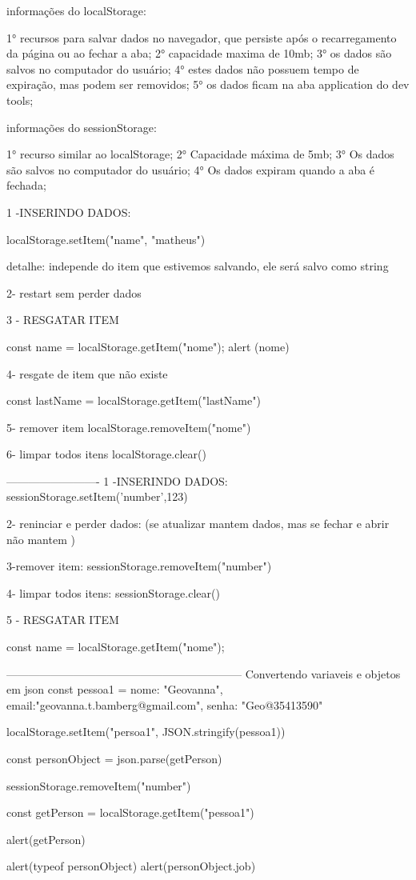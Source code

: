 informações do localStorage:

1° recursos para salvar dados no navegador, que persiste após o recarregamento da página ou ao fechar a aba;
2° capacidade maxima de 10mb;
3° os dados são salvos no computador do usuário;
4° estes dados não possuem tempo de expiração, mas podem ser removidos;
5° os dados ficam na aba application do dev tools;

informações do sessionStorage:

1° recurso similar ao localStorage;
2° Capacidade máxima de 5mb;
3° Os dados são salvos no computador do usuário;
4° Os dados expiram quando a aba é fechada;


1 -INSERINDO DADOS:

localStorage.setItem("name", "matheus")

detalhe: independe do item que estivemos salvando, ele será salvo como string

2- restart sem perder dados

3 - RESGATAR ITEM 

const name = localStorage.getItem("nome");
alert (nome)

4- resgate de item que não existe

const lastName = localStorage.getItem("lastName")

5- remover item
localStorage.removeItem("nome")

6- limpar todos itens
localStorage.clear()

-------------------------
1 -INSERINDO DADOS:
sessionStorage.setItem('number',123)

2- reninciar e perder dados: 
(se atualizar mantem dados, mas se fechar e abrir não mantem )


3-remover item:
sessionStorage.removeItem("number")

4- limpar todos itens: 
sessionStorage.clear()

5 - RESGATAR ITEM 

const name = localStorage.getItem("nome");

---------------------------------------------------------------
Convertendo variaveis e objetos em json
const pessoa1 = {
    nome: "Geovanna",
    email:"geovanna.t.bamberg@gmail.com",
    senha: "Geo@35413590"
}

localStorage.setItem("persoa1", JSON.stringify(pessoa1))


const personObject = json.parse(getPerson)


sessionStorage.removeItem("number")

const getPerson = localStorage.getItem("pessoa1")

alert(getPerson)

alert(typeof personObject)
alert(personObject.job)